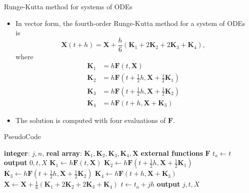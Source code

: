 \documentclass{beamer}
\begin{document}
\begin{frame}{Runge-Kutta method for systems of ODEs}
    \begin{itemize}
        \item In vector form, the fourth-order Runge-Kutta method for a system of ODEs is
        \[
        \mathbf{X}(t+h)=\mathbf{X}+\frac{h}{6}(\mathbf{K}_1+2 \mathbf{K}_2+2 \mathbf{K}_3+\mathbf{K}_4),
        \]
        where
        \begin{align*}
            \mathbf{K}_1&=h \mathbf{F}(t, \mathbf{X})\\
            \mathbf{K}_2&=h \mathbf{F}(t+\frac{1}{2}h, \mathbf{X}+\frac{1}{2} \mathbf{K}_1)\\
            \mathbf{K}_3&=h \mathbf{F}(t+\frac{1}{2}h, \mathbf{X}+\frac{1}{2} \mathbf{K}_2)\\
            \mathbf{K}_4&=h \mathbf{F}(t+h, \mathbf{X}+\mathbf{K}_3)
        \end{align*}
        \item The solution is computed with four evaluations of $\mathbf{F}$. 


    \end{itemize}
\end{frame}
\begin{frame}[fragile]{PseudoCode}

    \begin{algorithmic}
        \State \textbf{integer}: $j, n$, \textbf{real array}: $\mathbf{K}_1, \mathbf{K}_2, \mathbf{K}_3, \mathbf{K}_4, \mathbf{X}$
        \State \textbf{external functions} $\mathbf{F}$
        \State $t_a\gets t $
        \State \textbf{output} $0,t,X$
        \State $\mathbf{K}_1 \gets h \mathbf{F}(t,\mathbf{X})$
        \State $\mathbf{K}_2 \gets h \mathbf{F}(t+\frac{1}{2}h,\mathbf{X}+\frac{1}{2} \mathbf{K}_1)$
        \State $\mathbf{K}_3 \gets h \mathbf{F}(t+\frac{1}{2}h,\mathbf{X}+\frac{1}{2} \mathbf{K}_2)$
        \State $\mathbf{K}_4 \gets h \mathbf{F}(t+h,\mathbf{X}+ \mathbf{K}_3)$
        \State $\mathbf{X}\gets \mathbf{X}+\frac{1}{6}(\mathbf{K}_1+2\mathbf{K}_2+2\mathbf{K}_3+\mathbf{K}_4)$
        \State $t\gets t_a+jh$
        \State \textbf{output} $j,t,X$
        \EndFor
        \EndProcedure
    \end{algorithmic}
\end{frame}
\end{document}
